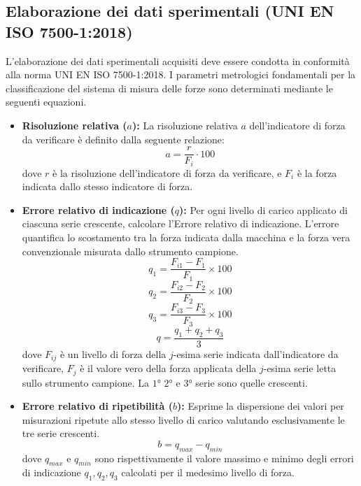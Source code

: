 \documentclass[a4paper, twoside]{article}
\begin{document}
\subsection{Elaborazione dei dati sperimentali (UNI EN ISO 7500-1:2018)}

L'elaborazione dei dati sperimentali acquisiti deve essere condotta in conformità alla norma UNI EN ISO 7500-1:2018. I parametri metrologici fondamentali per la classificazione del sistema di misura delle forze sono determinati mediante le seguenti equazioni.

\begin{itemize}
    \item \textbf{Risoluzione relativa ($a$):} La risoluzione relativa $a$ dell'indicatore di forza da verificare è definito dalla seguente relazione:
    \begin{equation}
        a=\frac{r}{F_i} \cdot 100
    \end{equation}
    dove $r$ è la risoluzione dell'indicatore di forza da verificare, e $F_i$ è la forza indicata dallo stesso indicatore di forza.
    
    \item \textbf{Errore relativo di indicazione ($q$):} Per ogni livello di carico applicato di ciascuna serie crescente, calcolare l'Errore relativo di indicazione. L'errore quantifica lo scostamento tra la forza indicata dalla macchina e la forza vera convenzionale misurata dallo strumento campione.
    \begin{equation}
        q_1 = \frac{F_{i1} - F_1}{F_1} \times 100
    \end{equation}
    \begin{equation}
         q_2 = \frac{F_{i2} - F_2}{F_2} \times 100
    \end{equation}
    \begin{equation}
         q_3 = \frac{F_{i3} - F_3}{F_3} \times 100
    \end{equation}  
    \begin{equation}
         q = \frac{q_1+q_2+q_3}{3}
    \end{equation}  
        dove $F_{ij}$ è un livello di forza della $j$-esima serie indicata dall'indicatore da verificare, $F_j$ è il valore vero della forza applicata della $j$-esima serie letta sullo strumento campione. La $1$° $2$° e $3$° serie sono quelle crescenti.
        
    \item \textbf{Errore relativo di ripetibilità ($b$):} Esprime la dispersione dei valori per misurazioni ripetute allo stesso livello di carico valutando esclusivamente le tre serie crescenti.
    \begin{equation}
        b = q_{max}-q_{min}
    \end{equation}
    dove $q_{max}$ e $q_{min}$ sono rispettivamente il valore massimo e minimo degli errori di indicazione $q_1, q_2, q_3$ calcolati per il medesimo livello di forza.


\end{itemize}
\end{document}
